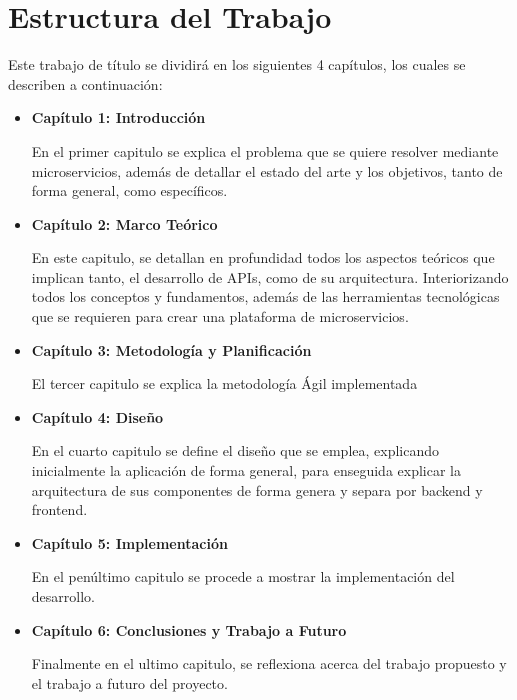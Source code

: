 
\chapter*{Estructura del Trabajo}

    Este trabajo de título se dividirá en los siguientes 4 capítulos, los cuales se describen a continuación:

    \begin{itemize}
      \item \textbf{Capítulo 1: Introducción} 

      En el primer capitulo se explica el problema que se quiere resolver mediante microservicios, además de detallar el estado del arte y los objetivos, tanto de forma general, como específicos.

      \item \textbf{Capítulo 2: Marco Teórico} 

      En este capitulo, se detallan en profundidad todos los aspectos teóricos que implican tanto, el desarrollo de APIs, como de su arquitectura. Interiorizando todos los conceptos y fundamentos, además de las herramientas tecnológicas que se requieren para crear una plataforma de microservicios.

      \item \textbf{Capítulo 3: Metodología y Planificación} 

      El tercer capitulo se explica la metodología Ágil implementada

      \item \textbf{Capítulo 4: Diseño} 
    
      En el cuarto capitulo se define el diseño que se emplea, explicando inicialmente la aplicación de forma general, para enseguida explicar la arquitectura de sus componentes de forma genera y separa por backend y frontend.
      
      \item \textbf{Capítulo 5: Implementación} 

     En el penúltimo capitulo se procede a mostrar la implementación del desarrollo.
     

      \item \textbf{Capítulo 6: Conclusiones y Trabajo a Futuro} 

    Finalmente en el ultimo capitulo, se reflexiona acerca del trabajo propuesto y el trabajo a futuro del proyecto.

    \end{itemize}